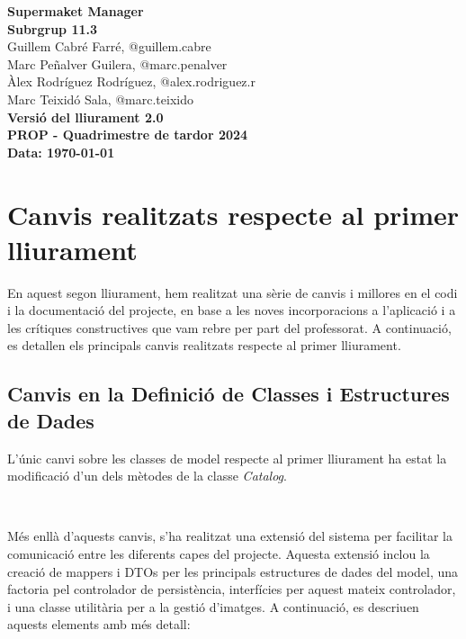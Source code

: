 \documentclass[a4paper,12pt]{report}
\newcommand{\titolPractica}{Supermaket Manager}
\newcommand{\identificadorEquip}{Subrgrup 11.3}
\newcommand{\PROPquatrimestre}{PROP - Quadrimestre de tardor 2024}
\newcommand{\versioLliurament}{Versió del lliurament 2.0}
\begin{document}
\begin{titlepage}
	\begin{center}
		{\Large \textbf{\titolPractica}} \\[10cm]
		\textbf{\large \identificadorEquip} \\[1cm]
		Guillem Cabré Farré, \small{@guillem.cabre} \\
		Marc Peñalver Guilera, \small{@marc.penalver} \\
		Àlex Rodríguez Rodríguez, \small{@alex.rodriguez.r} \\
		Marc Teixidó Sala, \small{@marc.teixido} \\[2cm]
		\textbf{\versioLliurament} \\
		\textbf{\PROPquatrimestre} \\
		\textbf{Data: \today}
	\end{center}
\end{titlepage}

\tableofcontents
\clearpage

\chapter{Canvis realitzats respecte al primer lliurament}

En aquest segon lliurament, hem realitzat una sèrie de canvis i millores en el codi i la documentació del projecte, en base a les noves incorporacions a l'aplicació i a les crítiques constructives que vam rebre per part del professorat. A continuació, es detallen els principals canvis realitzats respecte al primer lliurament.

\section{Canvis en la Definició de Classes i Estructures de Dades}

L'únic canvi sobre les classes de model respecte al primer lliurament ha estat la modificació d'un dels mètodes de la classe \textit{Catalog}. 

\

Més enllà d'aquests canvis, s'ha realitzat una extensió del sistema per facilitar la comunicació entre les diferents capes del projecte. Aquesta extensió inclou la creació de mappers i DTOs per les principals estructures de dades del model, una factoria pel controlador de persistència, interfícies per aquest mateix controlador, i una classe utilitària per a la gestió d'imatges. A continuació, es descriuen aquests elements amb més detall:
\end{document}
